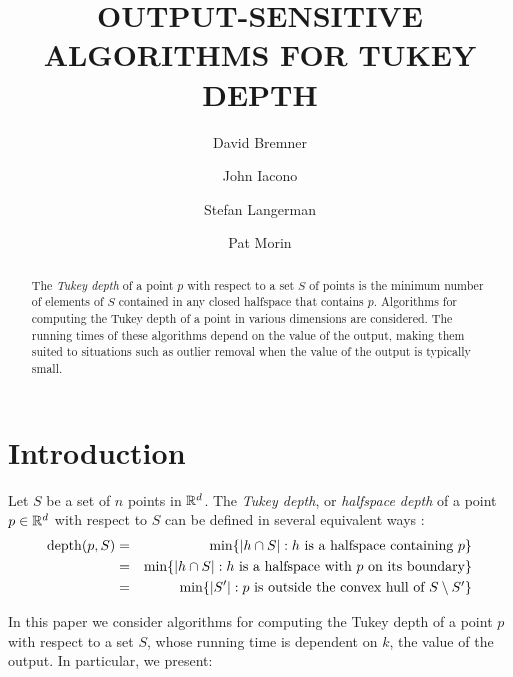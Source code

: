\documentclass[charterfonts,lotsofwhite]{patmorin}
\title{\MakeUppercase{Output-Sensitive Algorithms for Tukey Depth}}
\author{David Bremner \and
	John Iacono \and
	Stefan Langerman \and
	Pat Morin}
\date{}
\newcommand{\td}{\mathrm{depth}}
\begin{document}
\maketitle

\begin{abstract}
The \emph{Tukey depth} of a point $p$ with respect to a set $S$ of
points is the minimum number of elements of $S$ contained in any
closed halfspace that contains $p$.  Algorithms for computing the
Tukey depth of a point in various dimensions are considered.  The
running times of these algorithms depend on the value of the output,
making them suited to situations such as outlier removal when the
value of the output is typically small.
\end{abstract}

\section{Introduction}

Let $S$ be a set of $n$ points in $\mathbb{R}^d$.
The \emph{Tukey depth}, or \emph{halfspace depth} of a point $p\in\mathbb{R}^d$ with
respect to $S$ can be defined in several equivalent ways \cite{t73}:
\begin{eqnarray}
\td(p,S) & = & \min\{ |h\cap S| :
	             \mbox{$h$ is a halfspace containing $p$} \} \\ 
                     \eqlabel{tuk-orig}
            & = & \min\{ |h\cap S| :
                      \mbox{$h$ is a halfspace with $p$ on its boundary} \} \\ 
                       \eqlabel{tuk-boundary}
            & = & \min\{ |S'| :
                      \mbox{$p$ is outside the convex hull of 
                           $S\setminus S'$} \}
                      \eqlabel{tuk-hull}
\end{eqnarray}

In this paper we consider algorithms for computing the Tukey depth of
a point $p$ with respect to a set $S$, whose running time is dependent
on $k$, the value of the output. In particular, we present:
\end{document}

